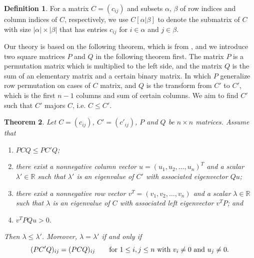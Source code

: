 \documentclass[12pt, a4paper]{article}
\theoremstyle{plain}
\newtheorem{thm}{Theorem}[section]
\theoremstyle{definition}
\newtheorem{defn}[thm]{Definition}
\begin{document}
\begin{defn}
    For a matrix $C=(c_{ij})$ and subsets $\alpha$, $\beta$ of row indices and column
    indices of $C$, respectively, we use $C[\alpha|\beta]$ to denote the
    submatrix of $C$ with size $ |\alpha| \times |\beta| $ that has entries $c_{ij}$ for $i\in \alpha$
    and $j\in\beta$.
\end{defn}

Our theory is based on the following theorem, which is from \cite{chang}, and we introduce two square matrices
 $P$ and $Q$ in the following theorem first. The matrix $P$ is a permutation
 matrix which is multiplied to the left side, and the matrix $Q$ is the sum of an elementary matrix and a
 certain binary matrix. In which $P$ generalize row permutation on cases of $C$ matrix, and $Q$ is the transform
 from $C'$ to $C'$, which is the first $n-1$ columns and sum of certain columns. We aim to find $C'$ such that
 $C'$ majors $C$, i.e. $C\leq C'$.

\begin{thm}\label{pre_thm}
    Let $C=(c_{ij})$, $C'=(c'_{ij})$, $P$ and $Q$ be $n\times n$ matrices.
Assume that
\begin{enumerate}[label=(\roman*)]
    \item \label{pre_thm_em1}  $PCQ\leq PC'Q$;
    \item \label{pre_thm_em2} there exist a nonnegative column vector $u=(u_1, u_2, \ldots, u_n)^T$  and a
    scalar $\lambda'\in \mathbb{R}$ such that $\lambda'$ is an eigenvalue of $C'$ with
    associated eigenvector $Qu$;
    \item \label{pre_thm_em3}  there exist a nonnegative row vector $v^T=(v_1, v_2, \ldots, v_n)$  and a scalar
    $\lambda\in \mathbb{R}$such that $\lambda$ is an eigenvalue of $C$ with associated  left
    eigenvector $v^TP$; and
    \item \label{pre_thm_em4} $v^TPQu>0.$
\end{enumerate}
    Then $\lambda\leq \lambda'$. Moreover, $\lambda=\lambda'$ if and only if
    \begin{equation}\label{pre0}
        (PC'Q)_{ij}=(PCQ)_{ij}\qquad \hbox{for~}1\leq i, j\leq n \hbox{~with~} v_i\ne 0 \hbox{~and~} u_j\ne 0.
    \end{equation}
\end{thm}
\end{document}
